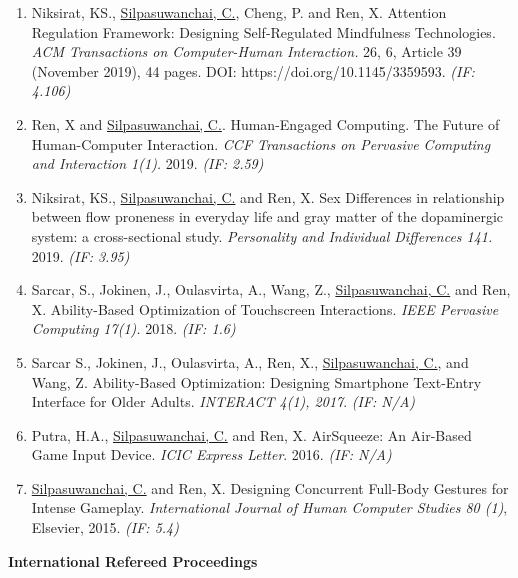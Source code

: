 \documentclass[letterpaper,11pt]{article}
\makeatletter
\newlength{\bibhang}
\newlength{\bibsep}
{\@listi \global\bibsep\itemsep \global\advance\bibsep by\parsep}
\newenvironment{bibsection}%
{\begin{enumerate}{}{%
			
			\setlength{\leftmargin}{\bibhang}%
			\setlength{\itemindent}{-\leftmargin}%
			\setlength{\itemsep}{\bibsep}%
			\setlength{\parsep}{\z@}%
			\setlength{\partopsep}{0pt}%
			\setlength{\topsep}{0pt}}}
	{\end{enumerate}}
\makeatother
\begin{document}
\begin{bibsection}
  	\item  Niksirat, KS., \underline{Silpasuwanchai, C.}, Cheng, P. and Ren, X. Attention Regulation Framework: Designing Self-Regulated Mindfulness Technologies. \textit{ACM Transactions on Computer-Human Interaction.} 26, 6, Article 39 (November 2019), 44 pages. DOI: https://doi.org/10.1145/3359593.  \textit{(IF: 4.106)}
  	\item Ren, X and  \underline{Silpasuwanchai, C.}. Human-Engaged Computing.  The Future of Human-Computer Interaction. \textit{CCF Transactions on Pervasive Computing and Interaction 1(1).}  2019.  \textit{(IF: 2.59)}
  	\item  Niksirat, KS., \underline{Silpasuwanchai, C.} and Ren, X. Sex Differences in relationship between flow proneness in everyday life and gray matter of the dopaminergic system: a cross-sectional study. \textit{Personality and Individual Differences 141.} 2019.  \textit{(IF: 3.95)}
	\item Sarcar, S., Jokinen, J., Oulasvirta, A., Wang, Z., \underline{Silpasuwanchai, C.} and Ren, X. Ability-Based Optimization of Touchscreen Interactions. \textit{IEEE Pervasive Computing 17(1).} 2018.  \textit{(IF: 1.6)}
  	\item Sarcar S., Jokinen, J., Oulasvirta, A., Ren, X.,  \underline{Silpasuwanchai, C.}, and Wang, Z. Ability-Based Optimization: Designing Smartphone Text-Entry Interface for Older Adults. \textit{INTERACT 4(1), 2017}.  \textit{(IF: N/A)}
  	\item Putra, H.A., \underline{Silpasuwanchai, C.} and Ren, X.  AirSqueeze: An Air-Based Game Input Device.  \textit{ICIC Express Letter}. 2016.  \textit{(IF: N/A)}   
  	\item \underline{Silpasuwanchai, C.} and Ren, X. Designing Concurrent Full-Body Gestures
  	for Intense Gameplay. \textit{International Journal of Human Computer Studies 80 (1)}, Elsevier, 2015. \textit{(IF: 5.4)}
\end{bibsection}
  \footnotesize
\textbf{International Refereed Proceedings}
\end{document}
